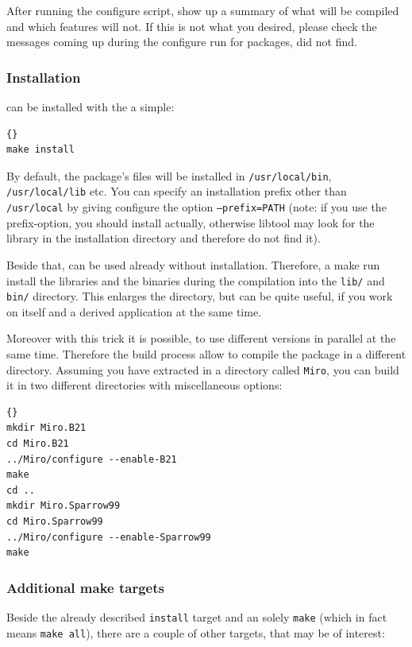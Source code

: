 \documentclass[10pt]{book}
\begin{document}
After running the configure script, \miro show up a summary of what
will be compiled and which features will not. If this is not what you
desired, please check the messages coming up during the configure run
for packages, \miro did not find.

\subsubsection{Installation}

\miro can be installed with the a simple:

\begin{lstlisting}[frame=tb]{}
make install
\end{lstlisting}

By default, the package's files will be installed in \texttt{/usr/local/bin},
\texttt{/usr/local/lib} etc.  You can specify an installation prefix other
than \texttt{/usr/local} by giving configure the option
\texttt{--prefix=PATH} (note: if you use the prefix-option, you should
install \miro actually, otherwise libtool may look for the library in
the installation directory and therefore do not find it).

Beside that, \miro can be used already without installation. Therefore,
a make run install the libraries and the binaries during the
compilation into the \texttt{lib/} and \texttt{bin/} directory. This
enlarges the \miro directory, but can be quite useful, if you work on
\miro itself and a derived application at the same time.

Moreover with this trick it is possible, to use different \miro
versions in parallel at the same time. Therefore the build process
allow to compile the package in a different directory. Assuming you
have extracted \miro in a directory called \texttt{Miro}, you can
build it in two different directories with miscellaneous options:

\begin{lstlisting}[frame=tb]{}
mkdir Miro.B21
cd Miro.B21
../Miro/configure --enable-B21
make
cd ..
mkdir Miro.Sparrow99
cd Miro.Sparrow99
../Miro/configure --enable-Sparrow99
make
\end{lstlisting}

\subsubsection{Additional make targets}

Beside the already described \texttt{install} target and an solely
\texttt{make} (which in fact means \texttt{make all}), there are a
couple of other targets, that may be of interest:
\end{document}
